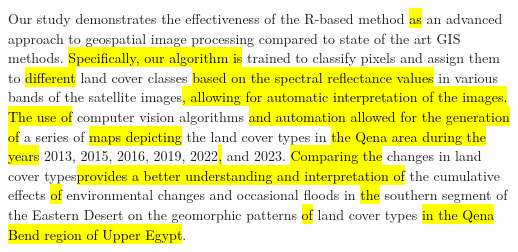 \documentclass[information,article,submit,pdftex,moreauthors]{Definitions/mdpi}
\begin{document}
Our study demonstrates the effectiveness of the R-based method \hl{as }an advanced approach to geospatial image processing compared to state of the art GIS methods. \hl{Specifically, our algorithm is }trained to classify pixels and assign them to \hl{different }land cover classes \hl{based on the spectral reflectance values }in various bands of the satellite images\hl{, allowing for automatic interpretation of the images. The use of }computer vision algorithms \hl{and automation allowed for the generation of } a series of \hl{maps depicting }the land cover types in \hl{the Qena area during the years }2013, 2015, 2016, 2019, 2022\hl{, }and 2023. \hl{Comparing the }changes in land cover types\hl{provides a better understanding and interpretation of }the cumulative effects \hl{of } environmental changes and occasional floods in \hl{the }southern segment of the Eastern Desert on the geomorphic patterns \hl{of } land cover types \hl{in the Qena Bend region of Upper Egypt}.







\end{document}
